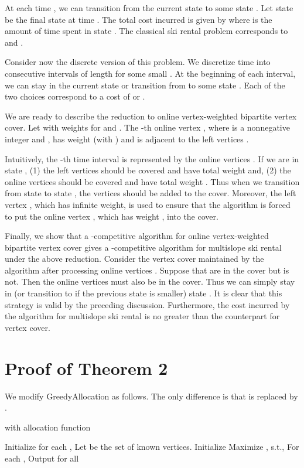 \documentclass{article}
\begin{document}
At each time , we can transition from the current state  to some state . Let state  be the final state at time . The total cost incurred is given by where  is the amount of time spent in state . The classical ski rental problem corresponds to  and .

Consider now the discrete version of this problem. We discretize time into consecutive intervals of length  for some small . At the beginning of each interval, we can stay in the current state  or transition from  to some state . Each of the two choices correspond to a cost of  or .



We are ready to describe the reduction to online vertex-weighted bipartite vertex cover. Let  with weights  for  and . The -th online vertex , where  is a nonnegative integer and , has weight  (with ) and is adjacent to the left vertices .

Intuitively, the -th time interval is represented by the online vertices . If we are in state , (1) the left vertices  should be covered and have total weight  and, (2) the online vertices  should be covered and have total weight . Thus when we transition from state  to state , the vertices  should be added to the cover. Moreover, the left vertex , which has infinite weight, is used to ensure that the algorithm is forced to put the online vertex , which has weight , into the cover.

Finally, we show that a -competitive algorithm for online vertex-weighted bipartite vertex cover gives a -competitive algorithm for multislope ski rental under the above reduction. Consider the vertex cover maintained by the algorithm after processing online vertices . Suppose that  are in the cover but  is not. Then the online vertices   must also be in the cover. Thus we can simply stay in (or transition to if the previous state is smaller) state . It is clear that this strategy is valid by the preceding discussion. Furthermore, the cost incurred by the algorithm for multislope ski rental is no greater than the counterpart for vertex cover.

\section{Proof of Theorem 2}
We modify GreedyAllocation as follows. The only difference is that  is replaced by .

\begin{algorithm}[h!]
\SetAlgoLined
\caption{ with allocation function }
\label{alg:general greedy}
Initialize for each , \;
Let  be the set of known vertices. Initialize \;
{
Maximize , s.t., \;
For each , \;
\;
\;
}
Output  for all \;
\end{algorithm}
\end{document}
